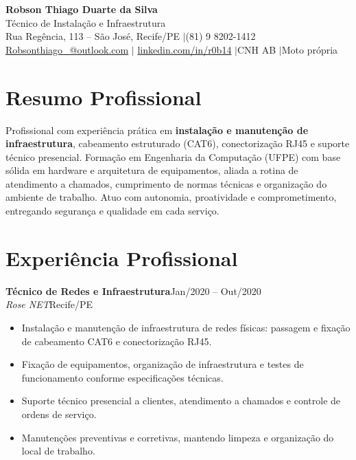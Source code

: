 \documentclass[10pt,a4paper]{article}
\newcommand{\cventry}[4]{%
  \vspace{3pt}%
  {\bfseries #1}\hfill{\color{gray}\small #3}\\
  {\itshape\color{accent} #2}\hfill{\color{gray}\small #4}\par
  \vspace{1pt}%
}
\begin{document}
\begin{center}
  {\color{primary}\Huge\bfseries Robson Thiago Duarte da Silva}\\[6pt]
  {\large\color{accent} Técnico de Instalação e Infraestrutura}\\[8pt]
  \small
  Rua Regência, 113 -- São José, Recife/PE \quad$\vert$\quad (81) 9 8202-1412\\[3pt]
  \href{mailto:Robsonthiago_@outlook.com}{Robsonthiago\_@outlook.com}
  \quad$\vert$\quad
  \href{https://linkedin.com/in/r0b14/}{linkedin.com/in/r0b14}
  \quad$\vert$\quad CNH AB \quad$\vert$\quad Moto própria
\end{center}

\section{Resumo Profissional}
Profissional com experiência prática em \textbf{instalação e manutenção de infraestrutura}, cabeamento estruturado (CAT6), conectorização RJ45 e suporte técnico presencial. Formação em Engenharia da Computação (UFPE) com base sólida em hardware e arquitetura de equipamentos, aliada a rotina de atendimento a chamados, cumprimento de normas técnicas e organização do ambiente de trabalho. Atuo com autonomia, proatividade e comprometimento, entregando segurança e qualidade em cada serviço.

\section{Experiência Profissional}

\cventry{Técnico de Redes e Infraestrutura}{Rose NET}{Jan/2020 -- Out/2020}{Recife/PE}
\begin{itemize}
  \item Instalação e manutenção de infraestrutura de redes físicas: passagem e fixação de cabeamento CAT6 e conectorização RJ45.
  \item Fixação de equipamentos, organização de infraestrutura e testes de funcionamento conforme especificações técnicas.
  \item Suporte técnico presencial a clientes, atendimento a chamados e controle de ordens de serviço.
  \item Manutenções preventivas e corretivas, mantendo limpeza e organização do local de trabalho.
\end{itemize}
\end{document}
